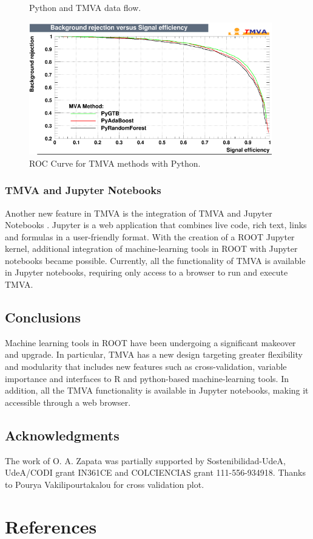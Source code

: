 \documentclass[a4paper]{jpconf}
\begin{document}
\begin{figure}[h]
\begin{minipage}{15pc}
\caption{\label{pymvadf}Python and TMVA data flow.}
\end{minipage}\hspace{2pc}%
\vspace{2pc}
\includegraphics[width=25pc]{img/pymvaroc.png}\caption{\label{pymvaroc} ROC Curve for TMVA methods with Python.}
\end{figure}





\subsubsection{TMVA and Jupyter Notebooks}
Another new feature in TMVA is the integration of TMVA and Jupyter Notebooks \cite{PER-GRA:2007}. Jupyter is a web application that combines live code, rich text, links and formulas in a user-friendly format. With the creation of a ROOT Jupyter kernel, additional integration of machine-learning tools in ROOT with Jupyter notebooks became possible. Currently, all the functionality of TMVA is available in Jupyter notebooks, requiring only access to a browser to run and execute TMVA.

\subsection{Conclusions}
Machine learning tools in ROOT have been undergoing a significant makeover and upgrade. In particular, TMVA has a new design targeting greater flexibility and modularity that includes new features such as cross-validation, variable importance and interfaces to R and python-based machine-learning tools. In addition, all the TMVA functionality is available in Jupyter notebooks, making it accessible through a web browser.

\subsection{Acknowledgments}
The work of O. A. Zapata was partially supported by Sostenibilidad-UdeA, UdeA/CODI grant IN361CE and COLCIENCIAS grant 111-556-934918.\newline
Thanks to Pourya Vakilipourtakalou for cross validation plot.
\section*{References}

\end{document}
